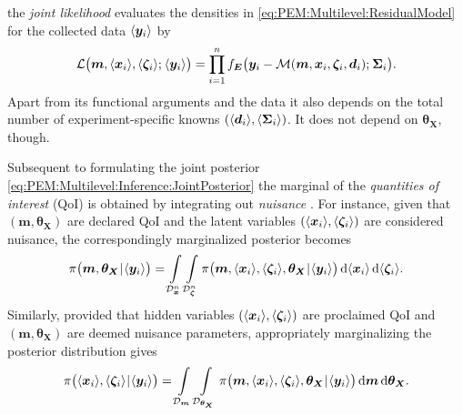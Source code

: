 the \textit{joint likelihood} evaluates the densities in \cref{eq:PEM:Multilevel:ResidualModel} for the collected data \(\langle{\bm{y}_i}\rangle\) by
\begin{equation} \label{eq:PEM:Multilevel:Inference:JointLikelihood}
  \mathcal{L} \big( \bm{m},\langle{\bm{x}_i}\rangle,\langle{\bm{\zeta}_i}\rangle ;{\:\!} \langle{\bm{y}_i}\rangle \big)
  = \prod\limits_{i=1}^n f_{\bm{E}} \big( \bm{y}_i-\mathcal{M}(\bm{m},\bm{x}_i,\bm{\zeta}_i,\bm{d}_i) ;{\:\!} \bm{\Sigma}_i \big).
\end{equation}
Apart from its functional arguments and the data it also depends on the total number of experiment-specific knowns \((\langle{\bm{d}_i}\rangle,\langle{\bm{\Sigma}_i}\rangle)\).
It does not depend on \(\bm{\theta}_{\bm{X}}\), though.
\par %
Subsequent to formulating the joint posterior \cref{eq:PEM:Multilevel:Inference:JointPosterior}
the marginal of the \textit{quantities of interest} (QoI) is obtained by integrating out \textit{nuisance} \cite{Statistics:Basu1977:a,Statistics:Dawid1980:a}.
For instance, given that \((\bm{m},\bm{\theta}_{\bm{X}})\) are declared QoI and the latent variables \((\langle{\bm{x}_i}\rangle,\langle{\bm{\zeta}_i}\rangle)\) are considered nuisance,
the correspondingly marginalized posterior becomes
\begin{equation} \label{eq:PEM:Multilevel:Inference:MarginalizedPosterior1}
  \pi \big( \bm{m},\bm{\theta}_{\bm{X}} {\:\!}|{\:\!} \langle{\bm{y}_i}\rangle \big) = \int\limits_{\mathcal{D}_{\bm{x}}^n} \int\limits_{\mathcal{D}_{\bm{\zeta}}^n}
  \pi \big( \bm{m},\langle{\bm{x}_i}\rangle,\langle{\bm{\zeta}_i}\rangle,\bm{\theta}_{\bm{X}} {\:\!}|{\:\!} \langle{\bm{y}_i}\rangle \big) \, \mathrm{d} \langle{\bm{x}_i}\rangle \, \mathrm{d} \langle{\bm{\zeta}_i}\rangle.
\end{equation}
Similarly, provided that hidden variables \((\langle{\bm{x}_i}\rangle,\langle{\bm{\zeta}_i}\rangle)\) are proclaimed QoI and \((\bm{m},\bm{\theta}_{\bm{X}})\) are deemed nuisance parameters,
appropriately marginalizing the posterior distribution gives
\begin{equation} \label{eq:PEM:Multilevel:Inference:MarginalizedPosterior2}
  \pi \big( \langle{\bm{x}_i}\rangle,\langle{\bm{\zeta}_i}\rangle {\:\!}|{\:\!} \langle{\bm{y}_i}\rangle \big) = \int\limits_{\mathcal{D}_{\bm{m}}} \int\limits_{\mathcal{D}_{\bm{\theta}_{\bm{X}}}}
  \pi \big( \bm{m},\langle{\bm{x}_i}\rangle,\langle{\bm{\zeta}_i}\rangle,\bm{\theta}_{\bm{X}} {\:\!}|{\:\!} \langle{\bm{y}_i}\rangle \big) \, \mathrm{d} \bm{m} \, \mathrm{d} \bm{\theta}_{\bm{X}}.
\end{equation}

